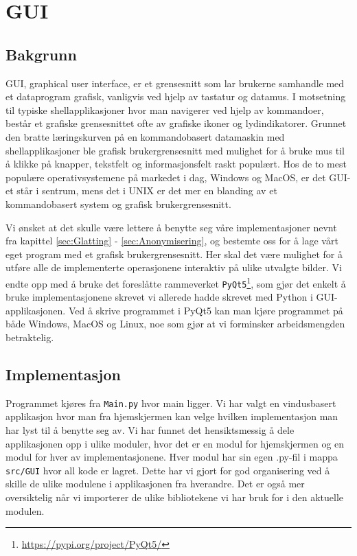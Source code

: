 \section{GUI}
\label{sec:Gui}
\subsection{Bakgrunn}
GUI, graphical user interface, er et grensesnitt som lar brukerne samhandle med et dataprogram grafisk, vanligvis ved hjelp av tastatur og datamus. I motsetning til typiske shellapplikasjoner hvor man navigerer ved hjelp av kommandoer, består et grafiske grensesnittet ofte av grafiske ikoner og lydindikatorer.\cite{wiki:GUI} Grunnet den bratte læringskurven på en kommandobasert datamaskin med shellapplikasjoner ble grafisk brukergrensesnitt med mulighet for å bruke mus til å klikke på knapper, tekstfelt og informasjonsfelt raskt populært. Hos de to mest populære operativsystemene på markedet i dag, Windows og MacOS, er det GUI-et står i sentrum, mens det i UNIX er det mer en blanding av et kommandobasert system og grafisk brukergrensesnitt.

Vi ønsket at det skulle være lettere å benytte seg våre implementasjoner nevnt fra kapittel \ref{sec:Glatting} - \ref{sec:Anonymisering}, og bestemte oss for å lage vårt eget program med et grafisk brukergrensesnitt. Her skal det være mulighet for å utføre alle de implementerte operasjonene interaktiv på ulike utvalgte bilder. Vi endte opp med å bruke det foreslåtte rammeverket \texttt{PyQt5}\footnote{\url{https://pypi.org/project/PyQt5/}}, som gjør det enkelt å bruke implementasjonene skrevet vi allerede hadde skrevet med Python i GUI-applikasjonen. Ved å skrive programmet i PyQt5 kan man kjøre programmet på både Windows, MacOS og Linux, noe som gjør at vi forminsker arbeidsmengden betraktelig.

\subsection{Implementasjon}
Programmet kjøres fra \texttt{Main.py} hvor main ligger. Vi har valgt en vindusbasert applikasjon hvor man fra hjemskjermen kan velge hvilken implementasjon man har lyst til å benytte seg av. Vi har funnet det hensiktsmessig å dele applikasjonen opp i ulike moduler, hvor det er en modul for hjemskjermen og en modul for hver av implementasjonene. Hver modul har sin egen .py-fil i mappa \texttt{src/GUI} hvor all kode er lagret. Dette har vi gjort for god organisering ved å skille de ulike modulene i applikasjonen fra hverandre. Det er også mer oversiktelig når vi importerer de ulike bibliotekene vi har bruk for i den aktuelle modulen. 

